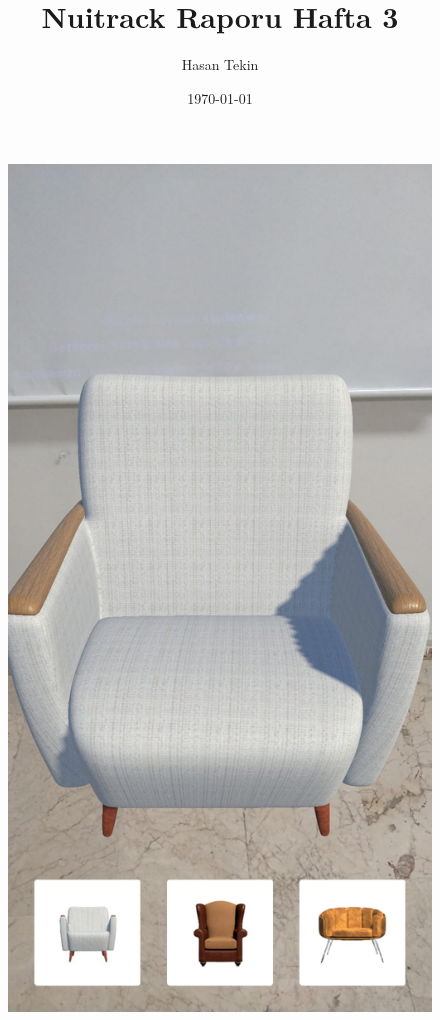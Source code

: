 \documentclass[12pt, a4paper]{article}
\begin{document}
\begin{figure}[!htb]
\begin{minipage}{0.48\textwidth}
			\includegraphics[width=.7\linewidth]{koltuk2.jpeg}
			\caption{}\label{Fig:Data2}
		\end{minipage}
	\end{figure}
	\newpage
		\title{Nuitrack Raporu Hafta 3}
	\author{Hasan Tekin}
	\date{\today}
	\maketitle
	
	\title{}
	\author{}
	\date{}
	\maketitle
		\setcounter{section}{0}
	
\end{document}
